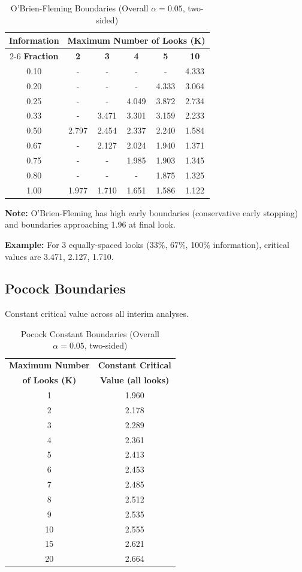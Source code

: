 \begin{table}[h]
\centering
\caption{O'Brien-Fleming Boundaries (Overall $\alpha = 0.05$, two-sided)}
\begin{tabular}{c|ccccc}
\toprule
\textbf{Information} & \multicolumn{5}{c}{\textbf{Maximum Number of Looks (K)}} \\
\cmidrule{2-6}
\textbf{Fraction} & \textbf{2} & \textbf{3} & \textbf{4} & \textbf{5} & \textbf{10} \\
\midrule
0.10 & - & - & - & - & 4.333 \\
0.20 & - & - & - & 4.333 & 3.064 \\
0.25 & - & - & 4.049 & 3.872 & 2.734 \\
0.33 & - & 3.471 & 3.301 & 3.159 & 2.233 \\
0.50 & 2.797 & 2.454 & 2.337 & 2.240 & 1.584 \\
0.67 & - & 2.127 & 2.024 & 1.940 & 1.371 \\
0.75 & - & - & 1.985 & 1.903 & 1.345 \\
0.80 & - & - & - & 1.875 & 1.325 \\
1.00 & 1.977 & 1.710 & 1.651 & 1.586 & 1.122 \\
\bottomrule
\end{tabular}
\end{table}

\textbf{Note:} O'Brien-Fleming has high early boundaries (conservative early stopping) and boundaries approaching 1.96 at final look.

\textbf{Example:} For 3 equally-spaced looks (33\%, 67\%, 100\% information), critical values are 3.471, 2.127, 1.710.

\subsection{Pocock Boundaries}

Constant critical value across all interim analyses.

\begin{table}[h]
\centering
\caption{Pocock Constant Boundaries (Overall $\alpha = 0.05$, two-sided)}
\begin{tabular}{cc}
\toprule
\textbf{Maximum Number} & \textbf{Constant Critical} \\
\textbf{of Looks (K)} & \textbf{Value (all looks)} \\
\midrule
1 & 1.960 \\
2 & 2.178 \\
3 & 2.289 \\
4 & 2.361 \\
5 & 2.413 \\
6 & 2.453 \\
7 & 2.485 \\
8 & 2.512 \\
9 & 2.535 \\
10 & 2.555 \\
15 & 2.621 \\
20 & 2.664 \\
\bottomrule
\end{tabular}
\end{table}

